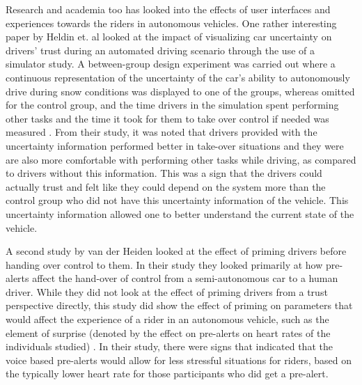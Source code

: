 \documentclass{sigchi}
\begin{document}
Research and academia too has looked into the effects of user interfaces and experiences towards the riders in autonomous vehicles. One rather interesting paper by Heldin et. al looked at the impact of visualizing car uncertainty on drivers’ trust during an automated driving scenario through the use of a simulator study. A between-group design experiment was carried out where a continuous representation of the uncertainty of the car’s ability to autonomously drive during snow conditions was displayed to one of the groups, whereas omitted for the control group, and the time drivers in the simulation spent performing other tasks and the time it took for them to take over control if needed was measured \cite{Helldin2013}. From their study, it was noted that drivers provided with the uncertainty information performed better in take-over situations and they were are also more comfortable with performing other tasks while driving, as compared to drivers without this information. This was a sign that the drivers could actually trust and felt like they could depend on the system more than the control group who did not have this uncertainty information of the vehicle. This uncertainty information allowed one to better understand the current state of the vehicle.

A second study by van der Heiden looked at the effect of priming drivers before handing over control to them. In their study they looked primarily at how pre-alerts affect the hand-over of control from a semi-autonomous car to a human driver. While they did not look at the effect of priming drivers from a trust perspective directly, this study did show the effect of priming on parameters that would affect the experience of a rider in an autonomous vehicle, such as the element of surprise (denoted by the effect on pre-alerts on heart rates of the individuals studied) \cite{vanderHeiden2017}. In their study, there were signs that indicated that the voice based pre-alerts would allow for less stressful situations for riders, based on the typically lower heart rate for those participants who did get a pre-alert.
\end{document}

